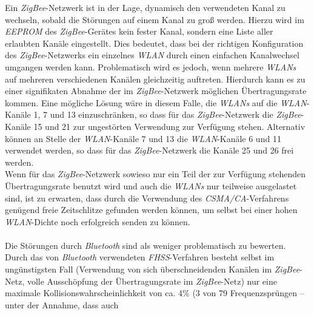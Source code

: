                 Ein \emph{ZigBee}-Netzwerk ist in der Lage, dynamisch den verwendeten Kanal zu wechseln, sobald die
                Störungen auf einem Kanal zu groß werden. Hierzu wird im \emph{EEPROM} des \emph{ZigBee}-Gerätes kein fester
                Kanal, sondern eine Liste aller erlaubten Kanäle eingestellt. Dies bedeutet, dass bei der
                richtigen Konfiguration des \emph{ZigBee}-Netzwerks ein einzelnes \emph{WLAN} durch einen einfachen 
                Kanalwechsel umgangen werden kann. Problematisch wird es jedoch, wenn mehrere \emph{WLANs} auf mehreren
                verschiedenen Kanälen gleichzeitig auftreten. Hierdurch kann es zu einer signifikaten Abnahme der im 
                \emph{ZigBee}-Netzwerk möglichen Übertragungsrate kommen. Eine mögliche Lösung wäre in diesem Falle, die 
                \emph{WLANs} auf die \emph{WLAN}-Kanäle 1, 7 und 13 einzuschränken, so dass für das 
                \emph{ZigBee}-Netzwerk die \emph{ZigBee}-Kanäle 15 und 21 zur ungestörten Verwendung zur Verfügung 
                stehen. Alternativ können an Stelle der \emph{WLAN}-Kanäle 7 und 13 die \emph{WLAN}-Kanäle 6 und 11 
                verwendet werden, so dass für das \emph{ZigBee}-Netzwerk die Kanäle 25 und 26 frei werden.\\
                Wenn für das \emph{ZigBee}-Netzwerk sowieso nur ein Teil der zur Verfügung stehenden Übertragungsrate benutzt
                wird und auch die \emph{WLANs} nur teilweise ausgelastet sind, ist zu erwarten, dass durch die Verwendung
                des \emph{CSMA/CA}-Verfahrens genügend freie Zeitschlitze gefunden werden können, um selbst bei einer
                hohen \emph{WLAN}-Dichte noch erfolgreich senden zu können.\\
                \\
                Die Störungen durch \emph{Bluetooth} sind als weniger problematisch zu bewerten. Durch das von 
                \emph{Bluetooth} verwendeten \emph{FHSS}-Verfahren besteht selbst im ungünstigsten Fall 
                (Verwendung von sich überschneidenden Kanälen im \emph{ZigBee}-Netz, volle Ausschöpfung der 
                 Übertragungsrate im \emph{ZigBee}-Netz) nur eine maximale Kollisionswahrscheinlichkeit von ca. 
                4\% (3 von 79 Frequenzsprüngen -- unter der Annahme, dass auch
